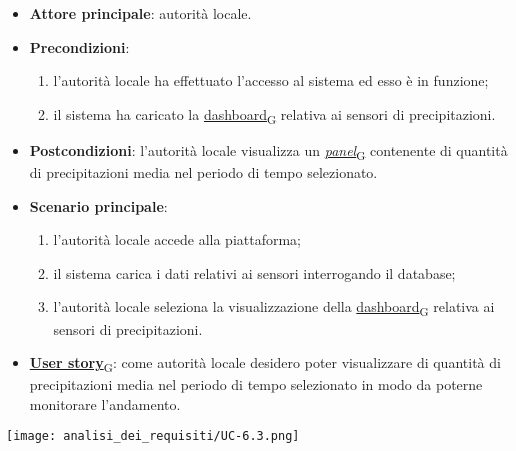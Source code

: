 \begin{itemize}
	\item \textbf{Attore principale}: autorità locale.
	\item \textbf{Precondizioni}:
	      \begin{enumerate}
		      \item l'autorità locale ha effettuato l'accesso al sistema ed esso è in funzione;
		      \item il sistema ha caricato la \href{https://7last.github.io/docs/pb/documentazione-interna/glossario\#dashboard}{dashboard\textsubscript{G}} relativa ai sensori di precipitazioni.
	      \end{enumerate}
	\item \textbf{Postcondizioni}: l'autorità locale visualizza un \href{https://7last.github.io/docs/pb/documentazione-interna/glossario\#panel}{\textit{panel}\textsubscript{G}} contenente di quantità di precipitazioni media nel periodo di tempo selezionato.
	\item \textbf{Scenario principale}:
	      \begin{enumerate}
		      \item l'autorità locale accede alla piattaforma;
		      \item il sistema carica i dati relativi ai sensori interrogando il database;
		      \item l'autorità locale seleziona la visualizzazione della \href{https://7last.github.io/docs/pb/documentazione-interna/glossario\#dashboard}{dashboard\textsubscript{G}} relativa ai sensori di precipitazioni.
	      \end{enumerate}
	\item \href{https://7last.github.io/docs/pb/documentazione-interna/glossario\#user-story}{\textbf{User story}\textsubscript{G}}: come autorità locale desidero poter visualizzare di quantità di precipitazioni media nel periodo di tempo selezionato
	      in modo da poterne monitorare l'andamento.
\end{itemize}
\begin{center}
	\texttt{[image: analisi\_dei\_requisiti/UC-6.3.png]}
\end{center}


